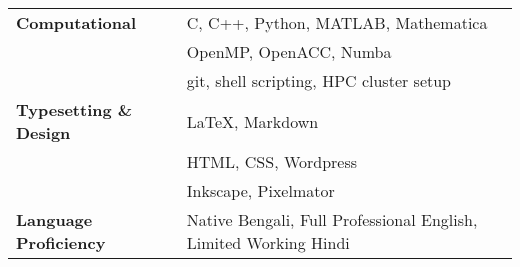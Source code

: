 \begin{longtable}[l]{@{} m{5cm} m{12cm}}
\textbf{Computational} & C, C++, Python, MATLAB, Mathematica\\
                                  & OpenMP, OpenACC, Numba\\
                                  & git, shell scripting, HPC cluster setup\\[0.2cm]

\textbf{Typesetting \& Design} & \LaTeX, Markdown \\
                                                          & HTML, CSS, Wordpress \\
                                                          & Inkscape, Pixelmator\\[0.2cm]
                                                            
\textbf{Language Proficiency} & Native Bengali, Full Professional English,  Limited Working Hindi\\                                               
\end{longtable}